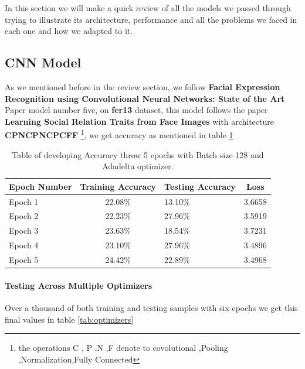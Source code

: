 In this section we will make a quick review of all the models we passed through trying to illustrate its architecture, performance and all the problems we faced in each one and how we adapted to it.
\subsection{CNN Model}
As we mentioned before in the review section, we follow \textbf{Facial Expression Recognition using Convolutional Neural Networks: State of the Art} Paper\cite{state_of_art} model number five,
on \textbf{fer13} dataset, this model follows the paper \textbf{Learning Social Relation Traits from Face Images} with architecture \textbf{CPNCPNCPCFF} \footnote{ the operations C , P ,N ,F denote to covolutional ,Pooling ,Normalization,Fully Connected }, we get accuracy as mentioned in table \ref{tab:14model}
\begin{table}[h!]
	\begin{center}
		\caption{Table of developing Accuracy throw 5 epochs with Batch size 128 and Adadelta optimizer.}
		\label{tab:14model}
		\begin{tabular}{l|c|l|c}
			\textbf{Epoch Number} & \textbf{Training Accuracy} & \textbf{Testing Accuracy} &\textbf{Loss}\\ 
			\hline 
			Epoch 1 & 22.08\% & 13.10\% & 3.6658 \\
			Epoch 2 & 22.23\% & 27.96\% & 3.5919 \\
			Epoch 3 & 23.63\% & 18.54\% & 3.7231 \\
			Epoch 4 & 23.10\% & 27.96\% & 3.4896 \\
			Epoch 5 & 24.42\% & 22.89\% &  3.4968 \\									
			\end{tabular}
	\end{center}

\end{table}
\paragraph{Testing Across Multiple Optimizers}
Over a thousand of both training and testing samples with six epochs we get this final values in table \ref{tab:optimizers}

